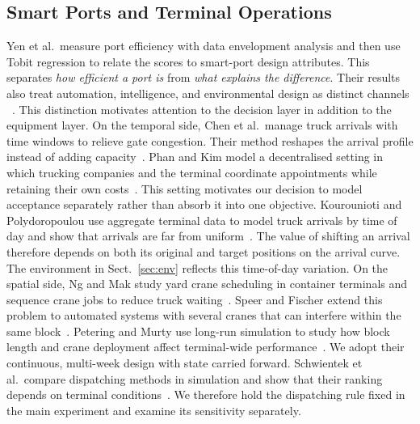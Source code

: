 \documentclass{llncs}
\begin{document}
\subsection{Smart Ports and Terminal Operations}
\label{sec:rel-port}
Yen et al.\ measure port efficiency with data envelopment analysis and
then use Tobit regression to relate the scores to smart-port design
attributes. This separates \emph{how efficient a port is} from
\emph{what explains the difference}. Their results also treat
automation, intelligence, and environmental design as distinct channels
~\cite{ref1}. This distinction motivates attention to the decision layer
in addition to the equipment layer.
On the temporal side, Chen et al.\ manage truck arrivals with time
windows to relieve gate congestion. Their method reshapes the arrival
profile instead of adding capacity~\cite{ref4}. Phan and Kim model a
decentralised setting in which trucking companies and the terminal
coordinate appointments while retaining their own costs~\cite{ref6}.
This setting motivates our decision to model acceptance separately
rather than absorb it into one objective. Kourounioti and
Polydoropoulou use aggregate terminal data to model truck arrivals by
time of day and show that arrivals are far from uniform~\cite{ref13}.
The value of shifting an arrival therefore depends on both its original
and target positions on the arrival curve. The environment in
Sect.~\ref{sec:env} reflects this time-of-day variation.
On the spatial side, Ng and Mak study yard crane scheduling in container
terminals and sequence crane jobs to reduce truck waiting~\cite{ref7}.
Speer and Fischer extend this problem to automated systems with several
cranes that can interfere within the same block~\cite{ref8}. Petering
and Murty use long-run simulation to study how block length and crane
deployment affect terminal-wide performance~\cite{ref9}. We adopt their
continuous, multi-week design with state carried forward. Schwientek et
al.\ compare dispatching methods in simulation and show that their
ranking depends on terminal conditions~\cite{ref16}. We therefore hold
the dispatching rule fixed in the main experiment and examine its
sensitivity separately.
\end{document}
